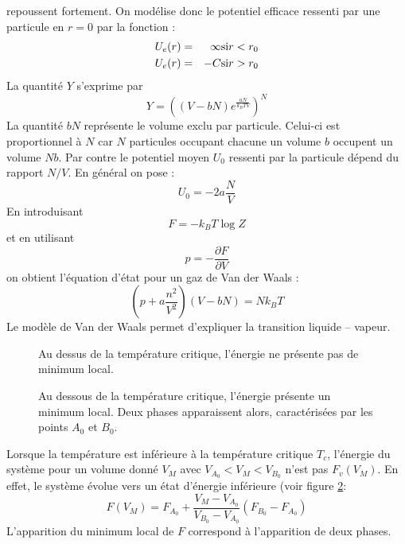 \documentclass[12pt]{book}
\begin{document}
repoussent fortement. On mod\'elise donc le potentiel efficace
ressenti par une particule en $r=0$ par la fonction :
\begin{eqnarray}
U_e(r)&=&\infty {\rm si} r<r_0\\
U_e(r)&=&-C {\rm si} r>r_0\\
\end{eqnarray}
La quantit\'e $Y$ s'exprime par
\begin{equation}
Y=\left((V-bN)e^{\frac{aN}{k_BTV}}\right)^N
\end{equation}
La quantit\'e $bN$ repr\'esente le volume exclu par particule.
Celui-ci est proportionnel \`a $N$ car $N$ particules occupant chacune un
volume $b$ occupent un volume $Nb$. Par contre le potentiel moyen $U_0$
ressenti par la particule d\'epend du rapport $N/V$. En g\'en\'eral on
pose :
\begin{equation}
U_0=-2a\frac{N}{V}
\end{equation}
En introduisant 
\begin{equation}
F=-k_BT\log Z
\end{equation}
et en utilisant 
\begin{equation}
p=-\frac{\partial F}{\partial V}
\end{equation}
on obtient l'\'equation d'\'etat pour un gaz de Van der Waals :
\begin{equation}
\left(p+a\frac{n^2}{V^2}\right)(V-bN)=Nk_BT
\end{equation}
Le mod\`ele de Van der Waals permet d'expliquer la transition liquide
-- vapeur. 
\begin{figure}[htb]
 \centerline{}   
 \caption{Au dessus de la temp\'erature critique, l'\'energie ne
pr\'esente pas 
de minimum local.}
 \label{figvanavant}
\end{figure}
\begin{figure}[htb]
 \centerline{}   
 \caption{Au dessous de la temp\'erature critique, l'\'energie
pr\'esente un minimum local. Deux phases apparaissent alors,
caract\'eris\'ees par les points $A_{0}$ et $B_0$.}
 \label{figvanapres}
\end{figure}
Lorsque la temp\'erature est inf\'erieure \`a la temp\'erature
critique $T_c$, l'\'energie du syst\`eme pour un volume donn\'e $V_M$
avec $V_{A_0}<V_M<V_{B_0}$ n'est pas $F_v(V_M)$. En effet, le syst\`eme
\'evolue vers un \'etat d'\'energie inf\'erieure (voir figure
\ref{figvanapres}:  
\begin{equation}
F(V_M)=F_{A_0}+\frac{V_M-V_{A_0}}{V_{B_0}-V_{A_0}}(F_{B_0}-F_{A_0})
\end{equation}
L'apparition du minimum local de $F$ correspond \`a l'apparition de
deux phases.
\end{document}
